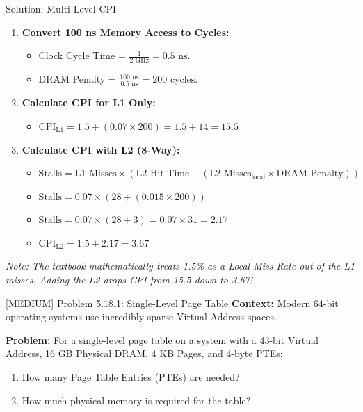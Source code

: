 \documentclass[aspectratio=169]{beamer}
\begin{document}
\begin{frame}{Solution: Multi-Level CPI}
\begin{enumerate}
    \item \textbf{Convert 100 ns Memory Access to Cycles:}
    \begin{itemize}
        \item Clock Cycle Time = $\frac{1}{2 \text{ GHz}} = 0.5 \text{ ns}$.
        \item DRAM Penalty = $\frac{100 \text{ ns}}{0.5 \text{ ns}} = 200 \text{ cycles}$.
    \end{itemize}
    \item \textbf{Calculate CPI for L1 Only:}
    \begin{itemize}
        \item $\text{CPI}_{\text{L1}} = 1.5 + (0.07 \times 200) = 1.5 + 14 = \mathbf{15.5}$
    \end{itemize}
    \item \textbf{Calculate CPI with L2 (8-Way):}
    \begin{itemize}
        \item $\text{Stalls} = \text{L1 Misses} \times (\text{L2 Hit Time} + (\text{L2 Misses}_{\text{local}} \times \text{DRAM Penalty}))$
        \item $\text{Stalls} = 0.07 \times (28 + (0.015 \times 200))$
        \item $\text{Stalls} = 0.07 \times (28 + 3) = 0.07 \times 31 = 2.17$
        \item $\text{CPI}_{\text{L2}} = 1.5 + 2.17 = \mathbf{3.67}$
    \end{itemize}
\end{enumerate}
\textit{Note: The textbook mathematically treats 1.5\% as a Local Miss Rate out of the L1 misses. Adding the L2 drops CPI from 15.5 down to 3.67!}
\end{frame}

\begin{frame}{[MEDIUM] Problem 5.18.1: Single-Level Page Table}
\textbf{Context:} Modern 64-bit operating systems use incredibly sparse Virtual Address spaces.
\vspace{0.5cm}

\textbf{Problem:}
For a single-level page table on a system with a 43-bit Virtual Address, 16 GB Physical DRAM, 4 KB Pages, and 4-byte PTEs:
\begin{enumerate}
    \item How many Page Table Entries (PTEs) are needed? 
    \item How much physical memory is required for the table?
\end{enumerate}
\end{frame}
\end{document}
